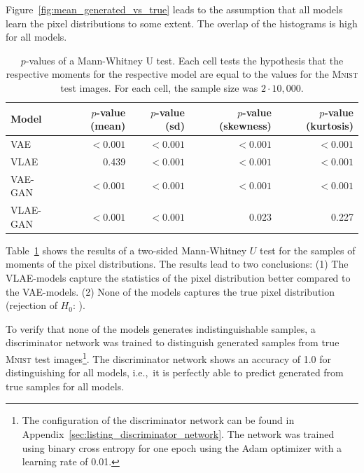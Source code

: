 Figure~\ref{fig:mean_generated_vs_true} leads to the assumption that all models learn the pixel distributions to some extent.
The overlap of the histograms is high for all models.
\begin{table}
    \begin{tabular}{lrrrr}
        \toprule
        Model              & $p$-value (mean) & $p$-value (sd) & $p$-value (skewness) & $p$-value (kurtosis) \\
        \midrule
        \ac{VAE}           & $< 0.001$        & $< 0.001$      & $< 0.001$            & $< 0.001$            \\
        \ac{VLAE}          & 0.439            & $< 0.001$      & $< 0.001$            & $< 0.001$            \\
        \ac{VAE}-\ac{GAN}  & $< 0.001$        & $< 0.001$      & $< 0.001$            & $< 0.001$            \\
        \ac{VLAE}-\ac{GAN} & $< 0.001$        & $< 0.001$      & 0.023                & 0.227                \\
        \bottomrule
    \end{tabular}
    \caption[Models on \textsc{Mnist} - $p$-values for Distributions]{$p$-values of a Mann-Whitney U test. Each cell tests the hypothesis that the respective moments for the respective model are equal to the values for the \textsc{Mnist} test images. For each cell, the sample size was $2\cdot 10,000$.}
    \label{tab:vae-vlae-mnist}
\end{table}
Table~\ref{tab:vae-vlae-mnist} shows the results of a two-sided Mann-Whitney $U$ test for the samples of moments of the pixel distributions.
The results lead to two conclusions: (1) The \ac{VLAE}-models capture the statistics of the pixel distribution better compared to the \ac{VAE}-models.
(2) None of the models captures the true pixel distribution (rejection of $H_0$: ).

To verify that none of the models generates indistinguishable samples, a discriminator network was trained to distinguish generated samples from true \textsc{Mnist} test images\footnote{The configuration of the discriminator network can be found in Appendix~\ref{sec:listing_discriminator_network}. The network was trained using binary cross entropy for one epoch using the Adam optimizer with a learning rate of 0.01.}.
The discriminator network shows an accuracy of 1.0 for distinguishing for all models, i.e.,~it is perfectly able to predict generated from true samples for all models.

